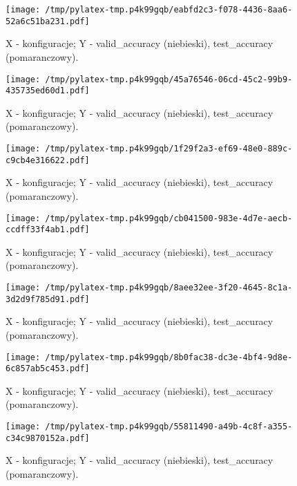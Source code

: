 \documentclass{article}%
\begin{document}
%
\newpage%


\begin{figure}[h]%
\centering%
\texttt{[image: /tmp/pylatex-tmp.p4k99gqb/eabfd2c3-f078-4436-8aa6-52a6c51ba231.pdf]}%
\caption{X {-} konfiguracje; Y {-} valid\_accuracy (niebieski), test\_accuracy (pomaranczowy).}%
\end{figure}

%
\newpage%


\begin{figure}[h]%
\centering%
\texttt{[image: /tmp/pylatex-tmp.p4k99gqb/45a76546-06cd-45c2-99b9-435735ed60d1.pdf]}%
\caption{X {-} konfiguracje; Y {-} valid\_accuracy (niebieski), test\_accuracy (pomaranczowy).}%
\end{figure}

%
\newpage%


\begin{figure}[h]%
\centering%
\texttt{[image: /tmp/pylatex-tmp.p4k99gqb/1f29f2a3-ef69-48e0-889c-c9cb4e316622.pdf]}%
\caption{X {-} konfiguracje; Y {-} valid\_accuracy (niebieski), test\_accuracy (pomaranczowy).}%
\end{figure}

%
\newpage%


\begin{figure}[h]%
\centering%
\texttt{[image: /tmp/pylatex-tmp.p4k99gqb/cb041500-983e-4d7e-aecb-ccdff33f4ab1.pdf]}%
\caption{X {-} konfiguracje; Y {-} valid\_accuracy (niebieski), test\_accuracy (pomaranczowy).}%
\end{figure}

%
\newpage%


\begin{figure}[h]%
\centering%
\texttt{[image: /tmp/pylatex-tmp.p4k99gqb/8aee32ee-3f20-4645-8c1a-3d2d9f785d91.pdf]}%
\caption{X {-} konfiguracje; Y {-} valid\_accuracy (niebieski), test\_accuracy (pomaranczowy).}%
\end{figure}

%
\newpage%


\begin{figure}[h]%
\centering%
\texttt{[image: /tmp/pylatex-tmp.p4k99gqb/8b0fac38-dc3e-4bf4-9d8e-6c857ab5c453.pdf]}%
\caption{X {-} konfiguracje; Y {-} valid\_accuracy (niebieski), test\_accuracy (pomaranczowy).}%
\end{figure}

%
\newpage%


\begin{figure}[h]%
\centering%
\texttt{[image: /tmp/pylatex-tmp.p4k99gqb/55811490-a49b-4c8f-a355-c34c9870152a.pdf]}%
\caption{X {-} konfiguracje; Y {-} valid\_accuracy (niebieski), test\_accuracy (pomaranczowy).}%
\end{figure}
\end{document}
